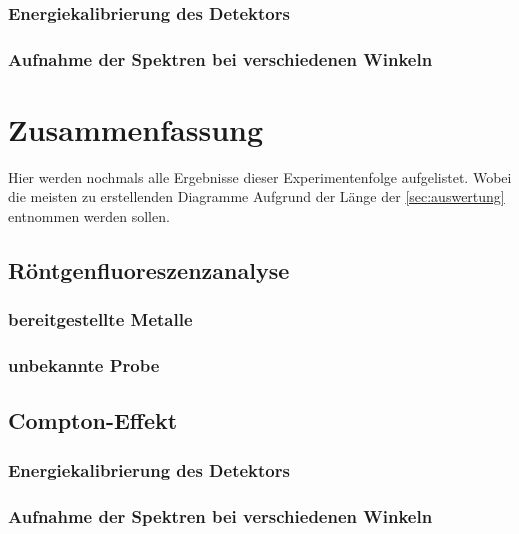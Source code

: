 \documentclass[12pt,english,ngerman]{scrartcl}
\begin{document}
\subsubsection{Energiekalibrierung des Detektors}

\subsubsection{Aufnahme der Spektren bei verschiedenen Winkeln}

\section{Zusammenfassung}\label{sec:zusammenfassung}

Hier werden nochmals alle Ergebnisse dieser Experimentenfolge aufgelistet.
Wobei die meisten zu erstellenden Diagramme Aufgrund der Länge der
\autoref{sec:auswertung} entnommen werden sollen.

\subsection{Röntgenfluoreszenzanalyse}

\subsubsection{bereitgestellte Metalle}

\subsubsection{unbekannte Probe}

\subsection{Compton-Effekt}

\subsubsection{Energiekalibrierung des Detektors}

\subsubsection{Aufnahme der Spektren bei verschiedenen Winkeln}

\newpage
\printbibliography
\listoffigures
\listoftables
\end{document}
